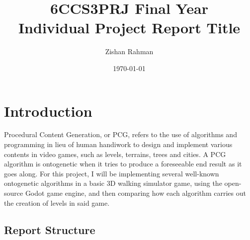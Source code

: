 \documentclass[11pt]{informatics-report}
\title{6CCS3PRJ Final Year\\\vspace{0.2cm}Individual Project Report Title}
\author{Zishan Rahman}
\date{\today}
\begin{document}
\createFrontMatter
\onehalfspacing
\tableofcontents
\doublespacing


\chapter{Introduction}

Procedural Content Generation, or PCG, refers to the use of algorithms and programming in lieu of human handiwork to design and implement various contents in video games, such as levels, terrains, trees and cities. A PCG algorithm is ontogenetic when it tries to produce a foreseeable end result as it goes along. For this project, I will be implementing several well-known ontogenetic algorithms in a basic 3D walking simulator game, using the open-source Godot game engine, and then comparing how each algorithm carries out the creation of levels in said game.

\section{Report Structure}












\appendix



\end{document}
